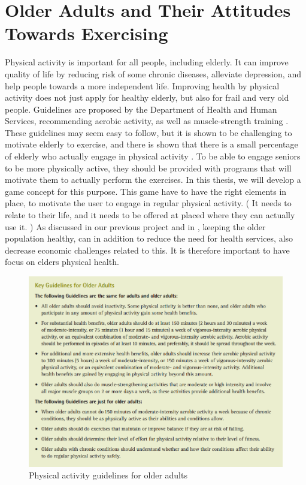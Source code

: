 \chapter{Older Adults and Their Attitudes Towards Exercising}
\label{chap:olderexercise}
Physical activity is important for all people, including elderly. It can improve quality of life by reducing risk of some chronic diseases, alleviate depression, and help people towards a more independent life. Improving health by physical activity does not just apply for healthy elderly, but also for frail and very old people. Guidelines are proposed by the Department of Health and Human Services, recommending aerobic activity, as well as muscle-strength training \cite{guidelines}. These guidelines  may seem easy to follow, but it is shown to be challenging to motivate elderly to exercise, and there is shown that there is a small percentage of elderly who actually engage in physical activity \cite{olderamericans}. To be able to engage seniors to be more physically active, they should be provided with programs that will motivate them to actually perform the exercises. In this thesis, we will develop a game concept for this purpose. This game have to have the right elements in place, to motivate the user to engage in regular physical activity. ( It needs to relate to their life, and it needs to be offered at placed where they can actually use it. ) As discussed in our previous project \cite{project} and in \cite{schutzer}, keeping the older population healthy, can in addition to reduce the need for health services, also decrease economic challenges related to this.  It is therefore important to have focus on elders physical health. 

\begin{figure}
\begin{center}
\includegraphics[scale=0.5]{exercisegl}
\caption[Physical activity guidelines for older adults]{Physical activity guidelines for older adults \cite{guidelines}}
\label{fig:exercisegl}
\end{center}
\end{figure} 

